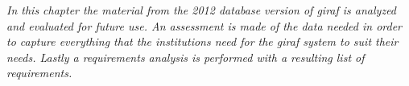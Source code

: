 \emph{In this chapter the material from the 2012 database version of \ac{giraf} is analyzed and evaluated for future use. An assessment is made of the data needed in order to capture everything that the institutions need for the \ac{giraf} system to suit their needs. Lastly a requirements analysis is performed with a resulting list of requirements.}
